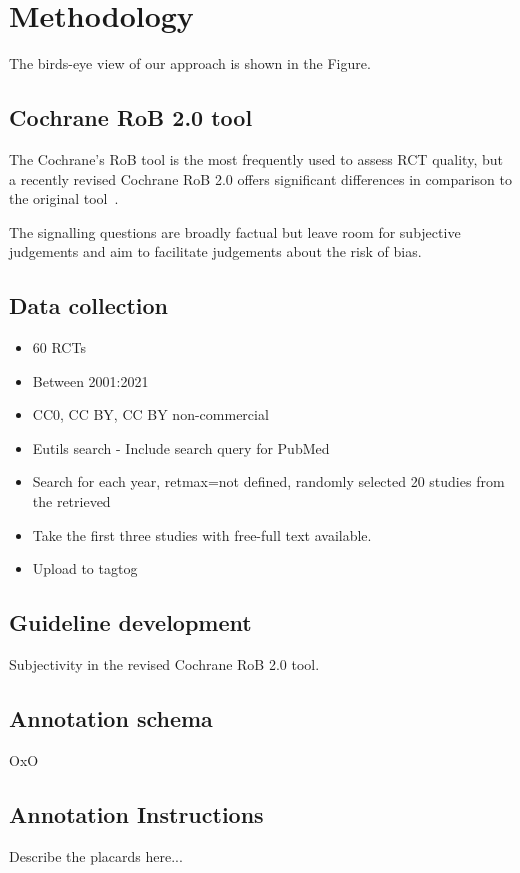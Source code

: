 \documentclass[sn-mathphys,Numbered]{sn-jnl}%
\theoremstyle{thmstyleone}%
\theoremstyle{thmstyletwo}%
\theoremstyle{thmstylethree}%
\begin{document}
\section{Methodology}
\label{sec:methods}
%
The birds-eye view of our approach is shown in the Figure.
%
%
%
\subsection{Cochrane RoB 2.0 tool}
\label{cochrane}
%
The Cochrane's RoB tool is the most frequently used to assess RCT quality, but a recently revised Cochrane RoB 2.0 offers significant differences in comparison to the original tool~\cite{ma2020methodological}.

The signalling questions are broadly factual but leave room for subjective judgements and aim to facilitate judgements about the risk of bias.
%
%
%
\subsection{Data collection}
\label{data}
%
\begin{itemize}
    \item 60 RCTs
    \item Between 2001:2021
    \item CC0, CC BY, CC BY non-commercial
    \item Eutils search - Include search query for PubMed
    \item Search for each year, retmax=not defined, randomly selected 20 studies from the retrieved
    \item Take the first three studies with free-full text available.
    \item Upload to tagtog
\end{itemize}
%
%
%
\subsection{Guideline development}
\label{guidelines}
%
Subjectivity in the revised Cochrane RoB 2.0 tool. %
%
%
%
\subsection{Annotation schema}
\label{schema}
%
OxO
%
%
%
\subsection{Annotation Instructions}
\label{instructions}
%
Describe the placards here...
%
%
%
\end{document}
